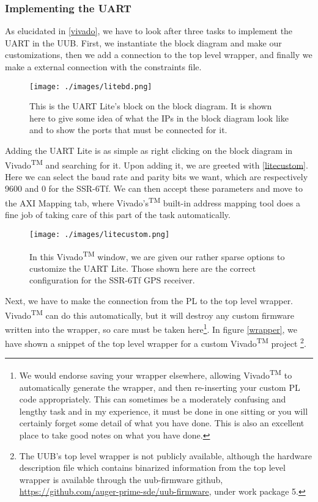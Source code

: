 \subsubsection{Implementing the UART}
As elucidated in \autoref{vivado}, we have to look after three tasks to implement the UART in the UUB. First, we instantiate the block diagram and make our customizations, then we add a connection to the top level wrapper, and finally we make a external connection with the constraints file.
\begin{figure}[h!]
\centering
\texttt{[image: ./images/litebd.png]}
\caption[UART Lite Block Diagram Representation]{This is the UART Lite's block on the block diagram. It is shown here to give some idea of what the IPs in the block diagram look like and to show the ports that must be connected for it.}
\label{litebd}
\end{figure}
Adding the UART Lite is as simple as right clicking on the block diagram in Vivado\textsuperscript{TM} and searching for it. Upon adding it, we are greeted with \autoref{litecustom}. Here we can select the baud rate and parity bits we want, which are respectively 9600 and 0 for the SSR-6Tf. We can then accept these parameters and move to the AXI Mapping tab, where Vivado's\textsuperscript{TM} built-in address mapping tool does a fine job of taking care of this part of the task automatically. 
\begin{figure}[h!]
\centering
\texttt{[image: ./images/litecustom.png]}
\caption[UART Lite Customization Parameters]{In this Vivado\textsuperscript{TM} window, we are given our rather sparse options to customize the UART Lite. Those shown here are the correct configuration for the SSR-6Tf GPS receiver.}
\label{litecustom}
\end{figure}
Next, we have to make the connection from the PL to the top level wrapper. Vivado\textsuperscript{TM} can do this automatically, but it will destroy any custom firmware written into the wrapper, so care must be taken here\footnote{ We would endorse saving your wrapper elsewhere, allowing Vivado\textsuperscript{TM} to automatically generate the wrapper, and then re-inserting your custom PL code appropriately. This can sometimes be a moderately confusing and lengthy task and in my experience, it must be done in one sitting or you will certainly forget some detail of what you have done. This is also an excellent place to take good notes on what you have done.}. In figure \autoref{wrapper}, we have shown a snippet of the top level wrapper for a custom Vivado\textsuperscript{TM} project \footnote{The UUB's top level wrapper is not publicly available, although the hardware description file which contains binarized information from the top level wrapper is available through the uub-firmware github, \url{https://github.com/auger-prime-sde/uub-firmware}, under work package 5.}.

